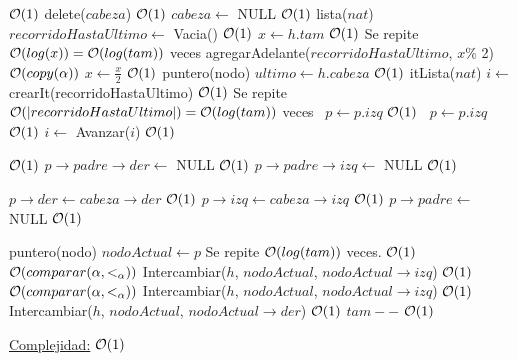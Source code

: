 \begin{Representacion}
\begin{Algoritmos}
\begin{algorithm}
\begin{algorithmic}[1]
   \Comment $\mathcal{O}(1)$
    \State delete($cabeza$) \Comment $\mathcal{O}(1)$
    \State $cabeza \gets$ NULL \Comment $\mathcal{O}(1)$
  \Else
    \State lista($nat$) $recorridoHastaUltimo \gets$ Vacia() \Comment $\mathcal{O}(1)$
    \State $x \gets h.tam$ \Comment $\mathcal{O}(1)$
     \Comment Se repite $\mathcal{O}(log(x)) = \mathcal{O}(log(tam))$ veces
      \State agregarAdelante($recorridoHastaUltimo$, $x$\% 2) \Comment $\mathcal{O}(copy(\alpha))$
      \State $x \gets \frac{x}{2}$ \Comment $\mathcal{O}(1)$
    \EndWhile
    \State puntero(nodo) $ultimo \gets h.cabeza$ \Comment $\mathcal{O}(1)$
    \State itLista($nat$) $i \gets$ crearIt(recorridoHastaUltimo) \Comment $\mathcal{O}(1)$
      \Comment Se repite $\mathcal{O}(|recorridoHastaUltimo|) = \mathcal{O}(log(tam))$ veces
       \ $p \gets p.izq$ \Comment $\mathcal{O}(1)$
      \Else \  $p \gets p.izq$ \Comment $\mathcal{O}(1)$
      \EndIf
      \State $i \gets$ Avanzar($i$) \Comment $\mathcal{O}(1)$
    \EndWhile
    
     \Comment $\mathcal{O}(1)$
      \State $p \to padre \to der \gets$ NULL \Comment $\mathcal{O}(1)$
    \Else
      \State $p \to padre \to izq \gets$ NULL \Comment $\mathcal{O}(1)$
    \EndIf
  
    \State $p \to der \gets cabeza \to der$ \Comment $\mathcal{O}(1)$
    \State $p \to izq \gets cabeza \to izq$ \Comment $\mathcal{O}(1)$
    \State $p \to padre \gets$ NULL \Comment $\mathcal{O}(1)$
  
    \State puntero(nodo) $nodoActual \gets p$
      \Comment Se repite $\mathcal{O}(log(tam))$ veces.
     \Comment $\mathcal{O}(1)$
         \Comment $\mathcal{O}(comparar(\alpha, <_\alpha))$
          \State Intercambiar($h$, $nodoActual$, $nodoActual \to izq$) \Comment $\mathcal{O}(1)$
        \Else 
            \Comment $\mathcal{O}(comparar(\alpha, <_\alpha))$ 
            \State Intercambiar($h$, $nodoActual$, $nodoActual \to izq$) \Comment $\mathcal{O}(1)$
          \Else
             \State Intercambiar($h$, $nodoActual$, $nodoActual \to der$) \Comment $\mathcal{O}(1)$
          \EndIf
        \EndIf
      \EndIf
    \EndWhile
   \EndIf
  \State $tam--$ \Comment $\mathcal{O}(1)$
 \EndProcedure
\end{algorithmic}

 \underline{Complejidad:} $\mathcal{O}(1)$
\end{algorithm}


\end{Algoritmos}

\end{Representacion}

